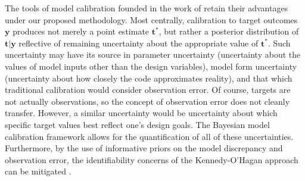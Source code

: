 \documentclass[12pt]{article}
\begin{document}
%
%
%
%
%

The tools of model calibration founded in the work of \cite{Kennedy2001} retain their advantages under our proposed methodology.
%
Most centrally, calibration to target outcomes $\mathbf y$ produces not merely a point estimate $\mathbf t^*$, but rather a posterior distribution of $\mathbf t|\mathbf y$ reflective of remaining uncertainty about the appropriate value of $\mathbf t^*$. 
%
Such uncertainty may have its source in parameter uncertainty (uncertainty about the values of model inputs other than the design variables), model form uncertainty (uncertainty about how closely the code approximates reality), and that which traditional calibration would consider observation error. 
%
Of course,  targets are not actually observations, so the concept of observation error does not cleanly transfer. 
%
However, a similar uncertainty would be uncertainty about which specific target values best reflect one's design goals.
%
The Bayesian model calibration framework allows for the quantification of all of these uncertainties. 
%
Furthermore, by the use of informative priors on the model discrepancy and observation error, the identifiability concerns of the Kennedy-O'Hagan approach can be mitigated \citep{Bayarri2007,Tuo2016}.
%
\end{document}
